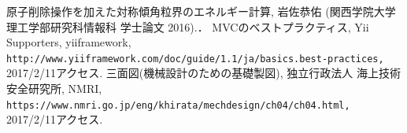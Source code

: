 \documentclass[a4j,twocolumn]{jsarticle}
\begin{document}
\begin{thebibliography}{9}
 原子削除操作を加えた対称傾角粒界のエネルギー計算, 岩佐恭佑 (関西学院大学 理工学部研究科情報科 学士論文 2016).． 
   MVCのベストプラクティス, Yii Supporters, yiiframework, \verb|http://www.yiiframework.com/doc/guide/1.1/ja/basics.best-practices,| 2017/2/11アクセス.
   三面図(機械設計のための基礎製図), 独立行政法人 海上技術安全研究所, NMRI, \verb|https://www.nmri.go.jp/eng/khirata/mechdesign/ch04/ch04.html,| 2017/2/11アクセス.
\end{thebibliography}
\end{document}
